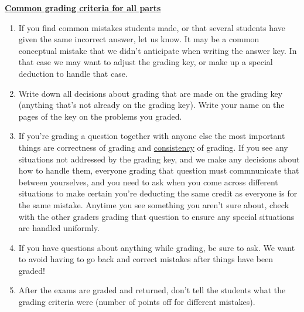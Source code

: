 \documentclass[11pt,fleqn]{article}
\begin{document}
{\begin{info}{\textbf{\underline{\Large Common grading criteria for all
                 parts}}}
\begin{enumerate}
        \item If you find common mistakes students made, or that several
              students have given the same incorrect answer, let us know.  It
              may be a common conceptual mistake that we didn't anticipate
              when writing the answer key.  In that case we may want to adjust
              the grading key, or make up a special deduction to handle that
              case.

        \item Write down all decisions about grading that are made on the
              grading key (anything that's not already on the grading key).
              Write your name on the pages of the key on the problems you
              graded.

        \item If you're grading a question together with anyone else the
              most important things are correctness of grading and
              \underline{consistency} of grading.  If you see any situations
              not addressed by the grading key, and we make any decisions
              about how to handle them, everyone grading that question must
              commnunicate that between yourselves, and you need to ask when
              you come across different situations to make certain you're
              deducting the same credit as everyone is for the same mistake.
              Anytime you see something you aren't sure about, check with the
              other graders grading that question to ensure any special
              situations are handled uniformly.

        \item If you have questions about anything while grading, be sure to
              ask.  We want to avoid having to go back and correct mistakes
              after things have been graded!

        \item After the exams are graded and returned, don't tell the students
              what the grading criteria were (number of points off for
              different mistakes).

      \end{enumerate}

      \vspace{-2.5mm}

      \pagebreak

    \end{info}

  }
\end{document}
